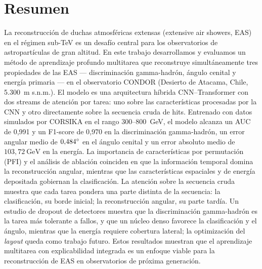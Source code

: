 \chapter*{Resumen}

La reconstrucción de duchas atmosféricas extensas (extensive air showers, EAS) en el régimen sub-TeV es un desafío central para los observatorios de astropartículas de gran altitud. En este trabajo desarrollamos y evaluamos un método de aprendizaje profundo multitarea que reconstruye simultáneamente tres propiedades de las EAS --- discriminación gamma-hadrón, ángulo cenital y energía primaria --- en el observatorio CONDOR (Desierto de Atacama, Chile, 5.300~m s.n.m.). El modelo es una arquitectura híbrida CNN--Transformer con dos streams de atención por tarea: uno sobre las características procesadas por la CNN y otro directamente sobre la secuencia cruda de hits.
%
Entrenado con datos simulados por CORSIKA en el rango 300--800~GeV, el modelo alcanza un AUC de 0{,}991 y un F1-score de 0{,}970 en la discriminación gamma-hadrón, un error angular medio de $0{,}484\degree$ en el ángulo cenital y un error absoluto medio de $103{,}72~\mathrm{GeV}$ en la energía. La importancia de características por permutación (PFI) y el análisis de ablación coinciden en que la información temporal domina la reconstrucción angular, mientras que las características espaciales y de energía depositada gobiernan la clasificación. La atención sobre la secuencia cruda muestra que cada tarea pondera una parte distinta de la secuencia: la clasificación, su borde inicial; la reconstrucción angular, su parte tardía.
%
Un estudio de dropout de detectores muestra que la discriminación gamma-hadrón es la tarea más tolerante a fallos, y que un núcleo denso favorece la clasificación y el ángulo, mientras que la energía requiere cobertura lateral; la optimización del \textit{layout} queda como trabajo futuro. Estos resultados muestran que el aprendizaje multitarea con explicabilidad integrada es un enfoque viable para la reconstrucción de EAS en observatorios de próxima generación.

\bigskip


